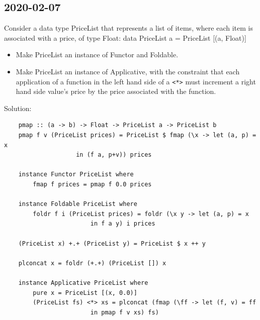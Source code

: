 \subsection{2020-02-07}
Consider a data type PriceList that represents a list of items, where each item is associated with a price,
of type Float:
data PriceList a = PriceList [(a, Float)]
\begin{itemize}
	\item Make PriceList an instance of Functor and Foldable.
	\item Make PriceList an instance of Applicative, with the constraint that each application of a function in the left hand side of a \texttt{<*>} must increment a right hand side value’s price by the price associated with the function.
\end{itemize}
Solution:
\begin{lstlisting}
	pmap :: (a -> b) -> Float -> PriceList a -> PriceList b
	pmap f v (PriceList prices) = PriceList $ fmap (\x -> let (a, p) = x
					in (f a, p+v)) prices
	
	instance Functor PriceList where
		fmap f prices = pmap f 0.0 prices
	
	instance Foldable PriceList where
		foldr f i (PriceList prices) = foldr (\x y -> let (a, p) = x
						in f a y) i prices
	
	(PriceList x) +.+ (PriceList y) = PriceList $ x ++ y
	
	plconcat x = foldr (+.+) (PriceList []) x
	
	instance Applicative PriceList where
		pure x = PriceList [(x, 0.0)]
		(PriceList fs) <*> xs = plconcat (fmap (\ff -> let (f, v) = ff
						in pmap f v xs) fs)
\end{lstlisting}






